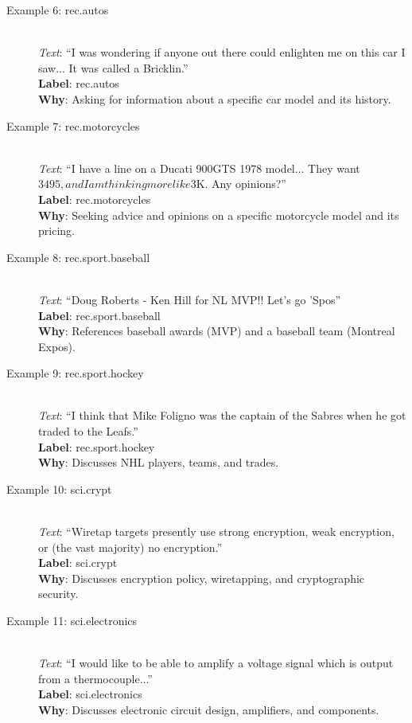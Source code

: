 \documentclass{article}
\begin{document}
\begin{description}
    \item[Example 6: rec.autos] \hfill \\
    \textit{Text}: ``I was wondering if anyone out there could enlighten me on this car I saw... It was called a Bricklin.'' \\
    \textbf{Label}: rec.autos \\
    \textbf{Why}: Asking for information about a specific car model and its history.

    \item[Example 7: rec.motorcycles] \hfill \\
    \textit{Text}: ``I have a line on a Ducati 900GTS 1978 model... They want $3495, and I am thinking more like $3K. Any opinions?'' \\
    \textbf{Label}: rec.motorcycles \\
    \textbf{Why}: Seeking advice and opinions on a specific motorcycle model and its pricing.

    \item[Example 8: rec.sport.baseball] \hfill \\
    \textit{Text}: ``Doug Roberts - Ken Hill for NL MVP!! Let's go 'Spos'' \\
    \textbf{Label}: rec.sport.baseball \\
    \textbf{Why}: References baseball awards (MVP) and a baseball team (Montreal Expos).

    \item[Example 9: rec.sport.hockey] \hfill \\
    \textit{Text}: ``I think that Mike Foligno was the captain of the Sabres when he got traded to the Leafs.'' \\
    \textbf{Label}: rec.sport.hockey \\
    \textbf{Why}: Discusses NHL players, teams, and trades.

    \item[Example 10: sci.crypt] \hfill \\
    \textit{Text}: ``Wiretap targets presently use strong encryption, weak encryption, or (the vast majority) no encryption.'' \\
    \textbf{Label}: sci.crypt \\
    \textbf{Why}: Discusses encryption policy, wiretapping, and cryptographic security.

    \item[Example 11: sci.electronics] \hfill \\
    \textit{Text}: ``I would like to be able to amplify a voltage signal which is output from a thermocouple...'' \\
    \textbf{Label}: sci.electronics \\
    \textbf{Why}: Discusses electronic circuit design, amplifiers, and components.


\end{description}
\end{document}
